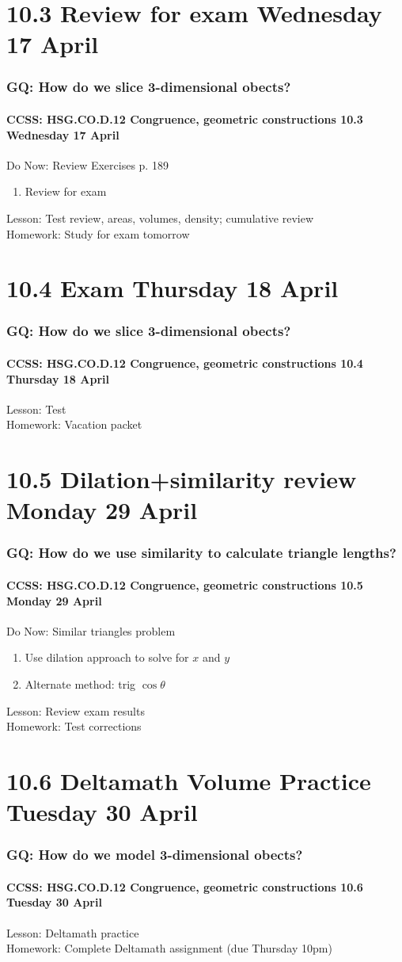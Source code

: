 \documentclass{beamer}
\begin{document}
\section{10.3 Review for exam Wednesday 17 April}
  \frame
  {
    \frametitle{GQ: How do we slice 3-dimensional obects?}
    \framesubtitle{CCSS: HSG.CO.D.12 Congruence, geometric constructions \hfill \alert{10.3 Wednesday 17 April}}

    \begin{block}{Do Now: Review Exercises p. 189}
      \begin{enumerate}
        \item Review for exam
    \end{enumerate}
    \end{block}
    Lesson: Test review, areas, volumes, density; cumulative review\\[1cm]
    Homework: Study for \alert{exam tomorrow}
  }

\section{10.4 Exam Thursday 18 April}
  \frame
  {
    \frametitle{GQ: How do we slice 3-dimensional obects?}
    \framesubtitle{CCSS: HSG.CO.D.12 Congruence, geometric constructions \hfill \alert{10.4 Thursday 18 April}}

    Lesson: Test \\[1cm]
    Homework: Vacation packet
  }

\section{10.5 Dilation+similarity review Monday 29 April}
  \frame
  {
    \frametitle{GQ: How do we use similarity to calculate triangle lengths?}
    \framesubtitle{CCSS: HSG.CO.D.12 Congruence, geometric constructions \hfill \alert{10.5 Monday 29 April}}
    \begin{block}{Do Now: Similar triangles problem}
      \begin{enumerate}
        \item Use dilation approach to solve for $x$ and $y$
        \item Alternate method: trig $\cos \theta$
    \end{enumerate}
    \end{block}
    Lesson: Review exam results\\[1cm]
    Homework: Test corrections
  }

\section{10.6 Deltamath Volume Practice Tuesday 30 April}
  \frame
  {
    \frametitle{GQ: How do we model 3-dimensional obects?}
    \framesubtitle{CCSS: HSG.CO.D.12 Congruence, geometric constructions \hfill \alert{10.6 Tuesday 30 April}}

    Lesson: Deltamath practice \\[1cm]
    Homework: Complete Deltamath assignment (due Thursday 10pm)
  }
\end{document}
